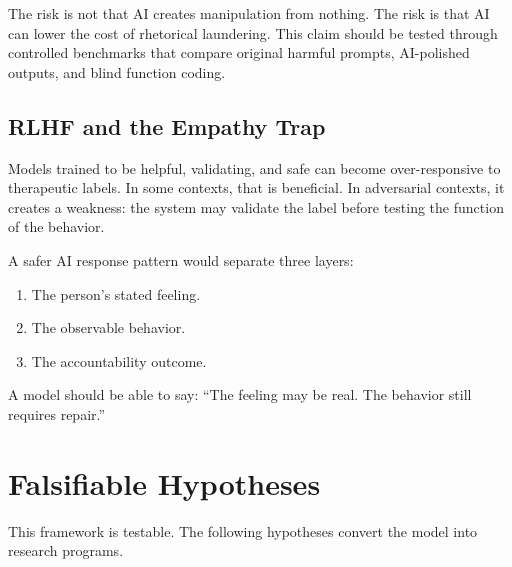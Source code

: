 \documentclass[11pt, letterpaper]{article}
\begin{document}
The risk is not that AI creates manipulation from nothing. The risk is that AI can lower the cost of rhetorical laundering. This claim should be tested through controlled benchmarks that compare original harmful prompts, AI-polished outputs, and blind function coding.

\subsection{RLHF and the Empathy Trap}

Models trained to be helpful, validating, and safe can become over-responsive to therapeutic labels. In some contexts, that is beneficial. In adversarial contexts, it creates a weakness: the system may validate the label before testing the function of the behavior.

A safer AI response pattern would separate three layers:

\begin{enumerate}
    \item The person's stated feeling.
    \item The observable behavior.
    \item The accountability outcome.
\end{enumerate}

A model should be able to say: ``The feeling may be real. The behavior still requires repair.''

\section{Falsifiable Hypotheses}

This framework is testable. The following hypotheses convert the model into research programs.
\end{document}

